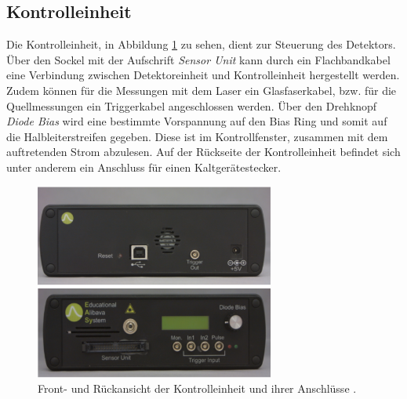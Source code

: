 \subsection{Kontrolleinheit}
Die Kontrolleinheit, in Abbildung \ref{fig:control} zu sehen, dient zur Steuerung des Detektors. Über den Sockel mit der Aufschrift \textit{Sensor Unit} kann durch ein  Flachbandkabel eine Verbindung zwischen Detektoreinheit und Kontrolleinheit hergestellt werden. Zudem können für die Messungen mit dem Laser ein Glasfaserkabel, bzw. für die Quellmessungen ein Triggerkabel angeschlossen werden. Über den Drehknopf \textit{Diode Bias} wird eine bestimmte Vorspannung auf den Bias Ring und somit auf die Halbleiterstreifen gegeben. Diese ist im Kontrollfenster, zusammen mit dem auftretenden Strom abzulesen.
Auf der Rückseite der Kontrolleinheit befindet sich unter anderem ein Anschluss für einen Kaltgerätestecker.
\begin{figure}[htb]
  \centering
  \includegraphics[width=0.7\textwidth]{images/Control.png}
  \caption{Front- und Rückansicht der Kontrolleinheit und ihrer Anschlüsse \cite{anleitung}.}
  \label{fig:control}
\end{figure}

